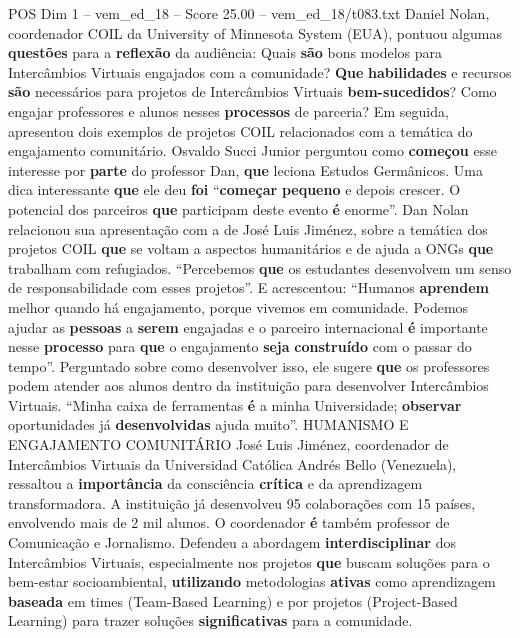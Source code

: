 \begin{textsample}{POS Dim 1 – vem\_ed\_18 – Score 25.00 – vem\_ed\_18/t083.txt}  \label{ex:f1_pos_113}
Daniel Nolan, coordenador COIL da University of Minnesota System (EUA), pontuou algumas \textbf{questões} para a \textbf{reflexão} da audiência: Quais \textbf{são} bons modelos para Intercâmbios Virtuais engajados com a comunidade? \textbf{Que} \textbf{habilidades} e recursos \textbf{são} necessários para projetos de Intercâmbios Virtuais \textbf{bem-sucedidos}?
Como engajar professores e alunos nesses \textbf{processos} de parceria?
Em seguida, apresentou dois exemplos de projetos COIL relacionados com a temática do engajamento comunitário.
Osvaldo Succi Junior perguntou como \textbf{começou} esse interesse por \textbf{parte} do professor Dan, \textbf{que} leciona Estudos Germânicos.
Uma dica interessante \textbf{que} ele deu \textbf{foi} “\textbf{começar} \textbf{pequeno} e depois crescer.
O potencial dos parceiros \textbf{que} participam deste evento \textbf{é} enorme”.
Dan Nolan relacionou sua apresentação com a de José Luis Jiménez, sobre a temática dos projetos COIL \textbf{que} se voltam a aspectos humanitários e de ajuda a ONGs \textbf{que} trabalham com refugiados. “Percebemos \textbf{que} os estudantes desenvolvem um senso de responsabilidade com esses projetos”.
E acrescentou: “Humanos \textbf{aprendem} melhor quando há engajamento, porque vivemos em comunidade.
Podemos ajudar as \textbf{pessoas} a \textbf{serem} engajadas e o parceiro internacional \textbf{é} importante nesse \textbf{processo} para \textbf{que} o engajamento \textbf{seja} \textbf{construído} com o passar do tempo”.
Perguntado sobre como desenvolver isso, ele sugere \textbf{que} os professores podem atender aos alunos dentro da instituição para desenvolver Intercâmbios Virtuais. “Minha caixa de ferramentas \textbf{é} a minha Universidade; \textbf{observar} oportunidades já \textbf{desenvolvidas} ajuda muito”.
HUMANISMO E ENGAJAMENTO COMUNITÁRIO José Luis Jiménez, coordenador de Intercâmbios Virtuais da Universidad Católica Andrés Bello (Venezuela), ressaltou a \textbf{importância} da consciência \textbf{crítica} e da aprendizagem transformadora.
A instituição já desenvolveu 95 colaborações com 15 países, envolvendo mais de 2 mil alunos.
O coordenador \textbf{é} também professor de Comunicação e Jornalismo.
Defendeu a abordagem \textbf{interdisciplinar} dos Intercâmbios Virtuais, especialmente nos projetos \textbf{que} buscam soluções para o bem-estar socioambiental, \textbf{utilizando} metodologias \textbf{ativas} como aprendizagem \textbf{baseada} em times (Team-Based Learning) e por projetos (Project-Based Learning) para trazer soluções \textbf{significativas} para a comunidade.

\end{textsample}

